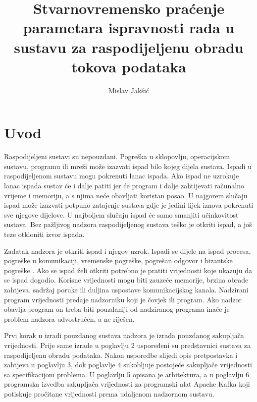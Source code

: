 \documentclass[utf8, diplomski, lmodern, numeric]{fer}
\begin{document}

\title{Stvarnovremensko praćenje parametara ispravnosti rada u sustavu za raspodijeljenu obradu tokova podataka}

\author{Mislav Jakšić}

\maketitle

\zahvala{}

\tableofcontents



\chapter{Uvod}

Raspodijeljeni sustavi su nepouzdani. Pogreška u sklopovlju, operacijskom sustavu, programu ili mreži može izazvati ispad bilo kojeg dijela sustava. Ispadi u raspodijeljenom sustavu mogu pokrenuti lanac ispada. Ako ispad ne uzrokuje lanac ispada sustav će i dalje patiti jer će program i dalje zahtijevati računalno vrijeme i memoriju, a s njima neće obavljati koristan posao. U najgorem slučaju ispad može izazvati potpuno zatajenje sustava gdje je jedini lijek iznova pokrenuti sve njegove dijelove. U najboljem slučaju ispad će samo smanjiti učinkovitost sustava. Bez pažljivog nadzora raspodijeljenog sustava teško je otkriti ispad, a još teze otkloniti izvor ispada.

Zadatak nadzora je otkriti ispad i njegov uzrok. Ispadi se dijele na ispad procesa, pogreške u komunikaciji, vremenske pogreške, pogrešan odgovor i bizantske pogreške \citep{rassus-manual}. Ako se ispad želi otkriti potrebno je pratiti vrijednosti koje ukazuju da se ispad dogodio. Korisne vrijednosti mogu biti zauzeće memorije, brzina obrade zahtjeva, sadržaj poruke ili duljina uspostave komunikacijskog kanala. Nadzirani program vrijednosti predaje nadzorniku koji je čovjek ili program. Ako nadzor obavlja program on treba biti pouzdaniji od nadziranog programa inače je problem nadzora udvostručen, a ne riješen.

Prvi korak u izradi pouzdanog sustava nadzora je izrada pouzdanog sakupljača vrijednosti. Prije same izrade u poglavlju 2 uspoređeni su predstavnici sustava za raspodijeljenu obradu podataka. Nakon usporedbe slijedi opis pretpostavka i zahtjeva u poglavlju 3, dok poglavlje 4 sukobljuje postojeće sakupljače vrijednosti sa specifikacijom problema. U poglavlju 5 opisana je arhitektura, a u poglavlju 6 programska izvedba sakupljača vrijednosti za programski alat Apache Kafka koji potiskuje pročitane vrijednosti prema udaljenom nadzornom sustavu.
\end{document}
